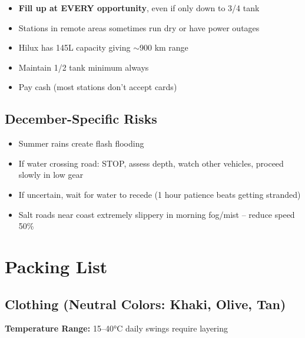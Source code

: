 \documentclass[11pt]{article}
\begin{document}
\begin{itemize}
    \item \textbf{Fill up at EVERY opportunity}, even if only down to 3/4 tank
    \item Stations in remote areas sometimes run dry or have power outages
    \item Hilux has 145L capacity giving $\sim$900 km range
    \item Maintain 1/2 tank minimum always
    \item Pay cash (most stations don't accept cards)
\end{itemize}

\subsection{December-Specific Risks}

\begin{itemize}
    \item Summer rains create flash flooding
    \item If water crossing road: STOP, assess depth, watch other vehicles, proceed slowly in low gear
    \item If uncertain, wait for water to recede (1 hour patience beats getting stranded)
    \item Salt roads near coast extremely slippery in morning fog/mist -- reduce speed 50\%
\end{itemize}



\clearpage
\section{Packing List}

\subsection{Clothing (Neutral Colors: Khaki, Olive, Tan)}

\textbf{Temperature Range:} 15--40°C daily swings require layering
\end{document}
